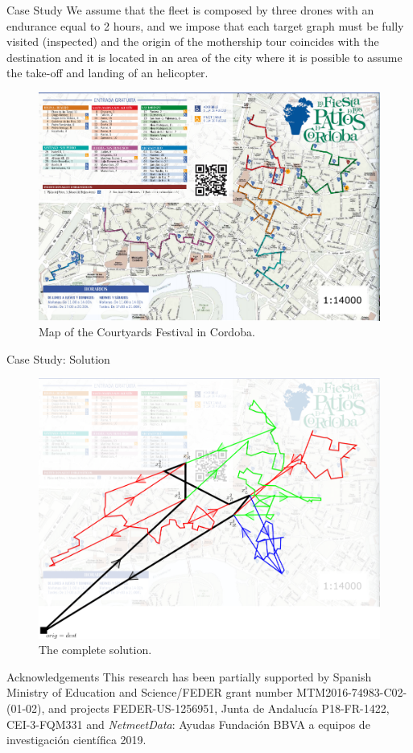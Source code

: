 \documentclass[slidestop,usepdftitle=false,10pt]{beamer}
\begin{document}
    \begin{frame}{Case Study}
        We assume that the fleet is composed by three drones with an endurance equal to 2 hours, and we impose that each target graph must be fully visited (inspected) and the origin of the mothership tour coincides with the destination and it is located in an area of the city where it is possible to assume the take-off and landing of an helicopter.
        \begin{figure}[h!]
        \centering
        \includegraphics[width=0.5\linewidth]{first.png}
        \caption{Map of the Courtyards Festival in Cordoba. \label{fig:mapPF}}
        \end{figure}
    \end{frame}
    
    \begin{frame}{Case Study: Solution}
        \begin{figure}[h!]
        \centering
        \includegraphics[width=0.7\linewidth]{third.png}
        \caption{The complete solution. \label{fig:tourD}}
        \end{figure}
    \end{frame}

    \begin{frame}{Acknowledgements}
        This research has been partially supported by Spanish Ministry of Education and Science/FEDER grant number  MTM2016-74983-C02-(01-02), and projects FEDER-US-1256951, Junta de Andaluc\'ia P18-FR-1422, CEI-3-FQM331 and  \textit{NetmeetData}: Ayudas Fundaci\'on BBVA a equipos de investigaci\'on cient\'ifica 2019.
    \end{frame}
    
\end{document}
